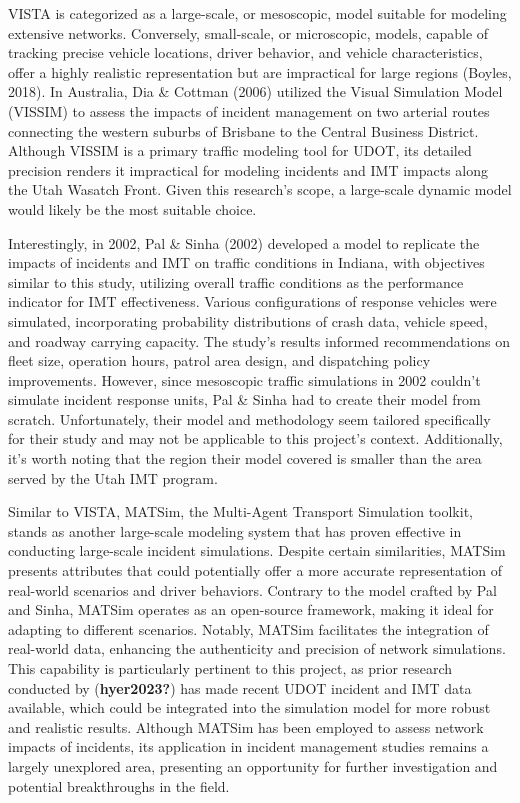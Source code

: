 \documentclass[fancy, oneside, mastersfancy, ms]{byuthesis}
\begin{document}
VISTA is categorized as a large-scale, or mesoscopic, model suitable for
modeling extensive networks. Conversely, small-scale, or microscopic,
models, capable of tracking precise vehicle locations, driver behavior,
and vehicle characteristics, offer a highly realistic representation but
are impractical for large regions (Boyles, 2018). In Australia, Dia \&
Cottman (2006) utilized the Visual Simulation Model (VISSIM) to assess
the impacts of incident management on two arterial routes connecting the
western suburbs of Brisbane to the Central Business District. Although
VISSIM is a primary traffic modeling tool for UDOT, its detailed
precision renders it impractical for modeling incidents and IMT impacts
along the Utah Wasatch Front. Given this research's scope, a large-scale
dynamic model would likely be the most suitable choice.

Interestingly, in 2002, Pal \& Sinha (2002) developed a model to
replicate the impacts of incidents and IMT on traffic conditions in
Indiana, with objectives similar to this study, utilizing overall
traffic conditions as the performance indicator for IMT effectiveness.
Various configurations of response vehicles were simulated,
incorporating probability distributions of crash data, vehicle speed,
and roadway carrying capacity. The study's results informed
recommendations on fleet size, operation hours, patrol area design, and
dispatching policy improvements. However, since mesoscopic traffic
simulations in 2002 couldn't simulate incident response units, Pal \&
Sinha had to create their model from scratch. Unfortunately, their model
and methodology seem tailored specifically for their study and may not
be applicable to this project's context. Additionally, it's worth noting
that the region their model covered is smaller than the area served by
the Utah IMT program.

Similar to VISTA, MATSim, the Multi-Agent Transport Simulation toolkit,
stands as another large-scale modeling system that has proven effective
in conducting large-scale incident simulations. Despite certain
similarities, MATSim presents attributes that could potentially offer a
more accurate representation of real-world scenarios and driver
behaviors. Contrary to the model crafted by Pal and Sinha, MATSim
operates as an open-source framework, making it ideal for adapting to
different scenarios. Notably, MATSim facilitates the integration of
real-world data, enhancing the authenticity and precision of network
simulations. This capability is particularly pertinent to this project,
as prior research conducted by (\textbf{hyer2023?}) has made recent UDOT
incident and IMT data available, which could be integrated into the
simulation model for more robust and realistic results. Although MATSim
has been employed to assess network impacts of incidents, its
application in incident management studies remains a largely unexplored
area, presenting an opportunity for further investigation and potential
breakthroughs in the field.
\end{document}
